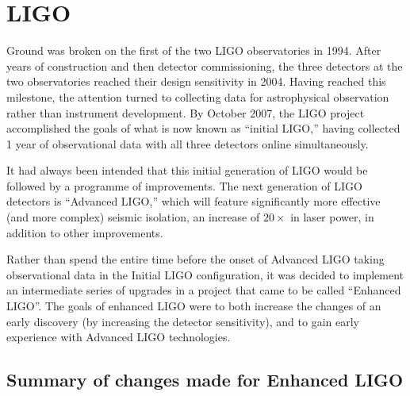 \section{LIGO}

Ground was broken on the first of the two LIGO observatories in 1994.
After years of construction and then detector commissioning, the three
detectors at the two observatories reached their design sensitivity in
2004.  Having reached this milestone, the attention turned to
collecting data for astrophysical observation rather than instrument
development.  By October 2007, the LIGO project accomplished the goals
of what is now known as ``initial LIGO,'' having collected 1 year of
observational data with all three detectors online simultaneously.

It had always been intended that this initial generation of LIGO would
be followed by a programme of improvements.  The next generation of
LIGO detectors is ``Advanced LIGO,'' which will feature significantly
more effective (and more complex) seismic isolation, an increase of
$20\times$ in laser power, in addition to other improvements.

Rather than spend the entire time before the onset of Advanced LIGO
taking observational data in the Initial LIGO configuration, it was
decided to implement an intermediate series of upgrades in a project
that came to be called ``Enhanced
LIGO''\cite{Adhikari2006Enhanced,T050252,JoshSmithEnhancedAdvanced}.
The goals of enhanced LIGO were to both increase the changes of an
early discovery (by increasing the detector sensitivity), and to gain
early experience with Advanced LIGO technologies.

\subsection{Summary of changes made for Enhanced LIGO}

